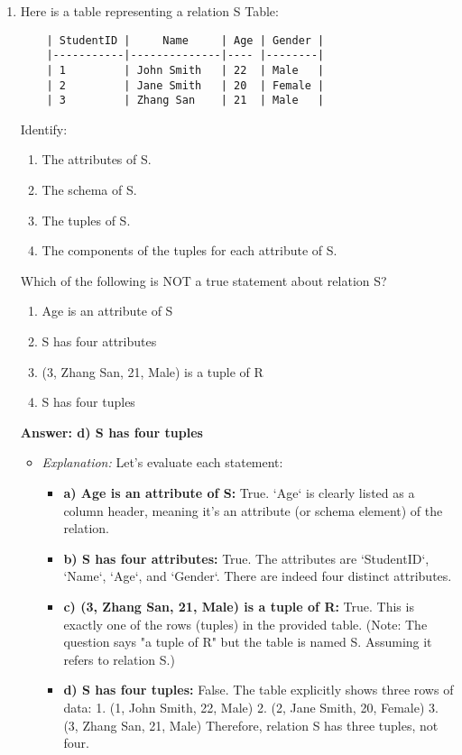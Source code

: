 \documentclass{article}
\begin{document}
\begin{enumerate}[label=\textbf{Question \arabic*.}]
\item Here is a table representing a relation S
    Table:
    \begin{verbatim}
    | StudentID |     Name     | Age | Gender |
    |-----------|--------------|---- |--------|
    | 1         | John Smith   | 22  | Male   |
    | 2         | Jane Smith   | 20  | Female |
    | 3         | Zhang San    | 21  | Male   |
    \end{verbatim}
    Identify:
    \begin{enumerate}[label=\arabic*.]
        \item The attributes of S.
        \item The schema of S.
        \item The tuples of S.
        \item The components of the tuples for each attribute of S.
    \end{enumerate}
    Which of the following is NOT a true statement about relation S?
    \begin{enumerate}[label=\alph*)]
        \item Age is an attribute of S
        \item S has four attributes
        \item (3, Zhang San, 21, Male) is a tuple of R
        \item S has four tuples
    \end{enumerate}
    \textbf{Answer: d) S has four tuples}
    \begin{itemize}
        \item \textit{Explanation:} Let's evaluate each statement:
        \begin{itemize}
            \item \textbf{a) Age is an attribute of S:} True. `Age` is clearly listed as a column header, meaning it's an attribute (or schema element) of the relation.
            \item \textbf{b) S has four attributes:} True. The attributes are `StudentID`, `Name`, `Age`, and `Gender`. There are indeed four distinct attributes.
            \item \textbf{c) (3, Zhang San, 21, Male) is a tuple of R:} True. This is exactly one of the rows (tuples) in the provided table. (Note: The question says "a tuple of R" but the table is named S. Assuming it refers to relation S.)
            \item \textbf{d) S has four tuples:} False. The table explicitly shows three rows of data:
                1. (1, John Smith, 22, Male)
                2. (2, Jane Smith, 20, Female)
                3. (3, Zhang San, 21, Male)
                Therefore, relation S has three tuples, not four.
        \end{itemize}
    \end{itemize}


\end{enumerate}
\end{document}
